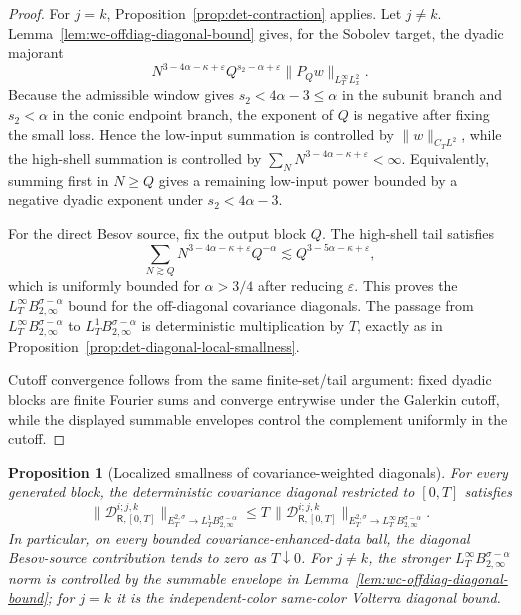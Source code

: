 \documentclass[10pt]{amsart}
\numberwithin{equation}{section}
\theoremstyle{plain}
\newtheorem{proposition}[theorem]{Proposition}
\theoremstyle{definition}
\theoremstyle{remark}
\newcommand{\eps}{\varepsilon}
\begin{document}
\begin{proof}
For \(j=k\), Proposition~\ref{prop:det-contraction} applies.  Let \(j\ne k\).  Lemma~\ref{lem:wc-offdiag-diagonal-bound} gives, for the Sobolev target, the dyadic majorant
\[
        N^{3-4\alpha-\kappa+\eps}Q^{s_2-\alpha+\eps}\|P_Qw\|_{L_T^\infty L_x^2}.
\]
Because the admissible window gives \(s_2<4\alpha-3\le \alpha\) in the subunit branch and \(s_2<\alpha\) in the conic endpoint branch, the exponent of \(Q\) is negative after fixing the small loss.  Hence the low-input summation is controlled by \(\|w\|_{C_TL^2}\), while the high-shell summation is controlled by \(\sum_N N^{3-4\alpha-\kappa+\eps}<\infty\).  Equivalently, summing first in \(N\ge Q\) gives a remaining low-input power bounded by a negative dyadic exponent under \(s_2<4\alpha-3\).

For the direct Besov source, fix the output block \(Q\).  The high-shell tail satisfies
\[
        \sum_{N\gtrsim Q}N^{3-4\alpha-\kappa+\eps}Q^{-\alpha}
        \lesssim Q^{3-5\alpha-\kappa+\eps},
\]
which is uniformly bounded for \(\alpha>3/4\) after reducing \(\eps\).  This proves the \(L_T^\infty B_{2,\infty}^{\sigma-\alpha}\) bound for the off-diagonal covariance diagonals.  The passage from \(L_T^\infty B_{2,\infty}^{\sigma-\alpha}\) to \(L_T^1B_{2,\infty}^{\sigma-\alpha}\) is deterministic multiplication by \(T\), exactly as in Proposition~\ref{prop:det-diagonal-local-smallness}.

Cutoff convergence follows from the same finite-set/tail argument: fixed dyadic blocks are finite Fourier sums and converge entrywise under the Galerkin cutoff, while the displayed summable envelopes control the complement uniformly in the cutoff.
\end{proof}


\begin{proposition}[Localized smallness of covariance-weighted diagonals]\label{prop:wc-diagonal-local-smallness}
For every generated block, the deterministic covariance diagonal restricted to \([0,T]\) satisfies
\begin{equation}\label{eq:wc-diagonal-local-smallness}
        \|\mathcal D_{\mathsf R,[0,T]}^{i;j,k}\|_{E_T^{2,\sigma}\to L_T^1B_{2,\infty}^{\sigma-\alpha}}
        \le T\,
        \|\mathcal D_{\mathsf R,[0,T]}^{i;j,k}\|_{E_T^{2,\sigma}\to L_T^\infty B_{2,\infty}^{\sigma-\alpha}}.
\end{equation}
In particular, on every bounded covariance-enhanced-data ball, the diagonal Besov-source contribution tends to zero as \(T\downarrow0\).  For \(j\ne k\), the stronger \(L_T^\infty B_{2,\infty}^{\sigma-\alpha}\) norm is controlled by the summable envelope in Lemma~\ref{lem:wc-offdiag-diagonal-bound}; for \(j=k\) it is the independent-color same-color Volterra diagonal bound.
\end{proposition}
\end{document}
